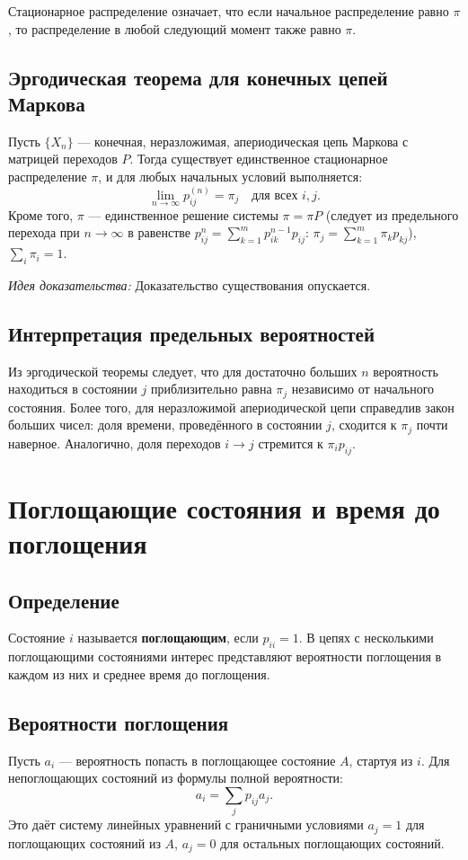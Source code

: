 \documentclass[10pt]{article}
\begin{document}
Стационарное распределение означает, что если начальное распределение равно $\pi$, то распределение в любой следующий момент также равно $\pi$.

\subsection{Эргодическая теорема для конечных цепей Маркова}

\begin{theorem}
Пусть $\{X_n\}$ — конечная, неразложимая, апериодическая цепь Маркова с матрицей переходов $P$. Тогда существует единственное стационарное распределение $\pi$, и для любых начальных условий выполняется:
\[
\lim_{n \to \infty} p_{ij}^{(n)} = \pi_j \quad \text{для всех } i,j.
\]
Кроме того, $\pi$ — единственное решение системы $\pi = \pi P$ (следует из предельного перехода при $n\rightarrow \infty$ в равенстве $p_{ij}^n = \sum_{k=1}^m p_{ik}^{n-1}p_{ij}$: $\pi_j = \sum_{k=1}^m \pi_k p_{kj}$), $\sum_i \pi_i = 1$.
\end{theorem}

\textit{Идея доказательства:} Доказательство существования опускается. 

\subsection{Интерпретация предельных вероятностей}
Из эргодической теоремы следует, что для достаточно больших $n$ вероятность находиться в состоянии $j$ приблизительно равна $\pi_j$ независимо от начального состояния. Более того, для неразложимой апериодической цепи справедлив закон больших чисел: доля времени, проведённого в состоянии $j$, сходится к $\pi_j$ почти наверное. Аналогично, доля переходов $i\to j$ стремится к $\pi_i p_{ij}$.

\section{Поглощающие состояния и время до поглощения}

\subsection{Определение}
Состояние $i$ называется \textbf{поглощающим}, если $p_{ii}=1$. В цепях с несколькими поглощающими состояниями интерес представляют вероятности поглощения в каждом из них и среднее время до поглощения.

\subsection{Вероятности поглощения}
Пусть $a_i$ — вероятность попасть в поглощающее состояние $A$, стартуя из $i$. Для непоглощающих состояний из формулы полной вероятности:
\[
a_i = \sum_{j} p_{ij} a_j.
\]
Это даёт систему линейных уравнений с граничными условиями $a_j = 1$ для поглощающих состояний из $A$, $a_j = 0$ для остальных поглощающих состояний.
\end{document}
